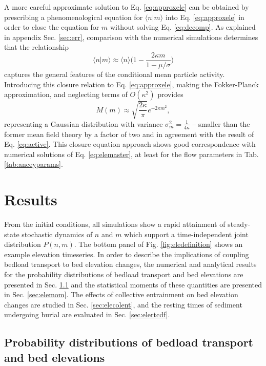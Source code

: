 A more careful approximate solution to Eq. \ref{eq:approxele} can be obtained by prescribing a phenomenological equation for $\langle n | m \rangle$ into Eq. \ref{eq:approxele} in order to close the equation for $m$ without solving Eq. \ref{eq:decomp}.
As explained in appendix Sec. \ref{sec:err}, comparison with the numerical simulations determines that
the relationship
\begin{equation}
	\langle n | m  \rangle \approx \langle n \rangle \Big( 1 - \frac{2\kappa m}{1-\mu/\sigma}\Big) \label{eq:closure}
\end{equation}
captures the general features of the conditional mean particle activity.
Introducing this closure relation to Eq. \ref{eq:approxele}, making the Fokker-Planck approximation, and neglecting terms of $O(\kappa^2)$ provides 
\begin{equation} M(m) \approx \sqrt{\frac{2\kappa}{\pi}} e^{-2\kappa m^2}, \label{eq:ou2}\end{equation}
representing a Gaussian distribution with variance $\sigma_m^2 = \frac{1}{4\kappa}$ -- smaller than the former mean field theory by a factor of two and in agreement with the result of Eq. \ref{eq:active}.
This closure equation approach shows good correspondence with numerical solutions of Eq. \ref{eq:elemaster}, at least for the flow parameters in Tab. \ref{tab:anceyparams}.

\section{Results}
\label{sec:eleresults}

From the initial conditions, all simulations show a rapid attainment of steady-state stochastic dynamics of $n$ and $m$ which support a time-independent joint distribution $P(n,m)$. The bottom panel of Fig. \ref{fig:eledefinition} shows an example elevation timeseries. In order to describe the implications of coupling bedload transport to bed elevation changes, the numerical and analytical results for the probability distributions of bedload transport and bed elevations are presented in Sec. \ref{sec:elepdf} and the statistical moments of these quantities are presented in Sec. \ref{sec:elemom}. The effects of collective entrainment on bed elevation changes are studied in Sec. \ref{sec:elecolent}, and the resting times of sediment undergoing burial are evaluated in Sec. \ref{sec:elertcdf}.

\subsection{Probability distributions of bedload transport and bed elevations}
\label{sec:elepdf}

